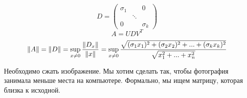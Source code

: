 \documentclass[main.tex]{subfiles}
\begin{document}
    \begin{Proof}[п. 4]
        \[D = \begin{pmatrix}
            \sigma_1 & & 0\\
                 &\ddots& \\
            0 & & \sigma_k
        \end{pmatrix}\]
        \[A = UDV^T\]
        \[\lVert A \rVert = \lVert D \rVert = \sup_{x \neq 0} \frac{\lVert D_x \rVert}{\lVert x \rVert} =
        \sup_{x \neq 0} \frac{\sqrt{(\sigma_1 x_1)^2 + (\sigma_2 x_2)^2 + ... +
    (\sigma_k x_k)^2}}{\sqrt{x_1^2 + ... + x_n^2}} \]
    \end{Proof}

    \begin{task}
        Необходимо сжать изображение. Мы хотим сделать так, чтобы
        фотография занимала меньше места на компьютере. Формально, мы ищем
        матрицу, которая близка к исходной.
    \end{task}
\end{document}
